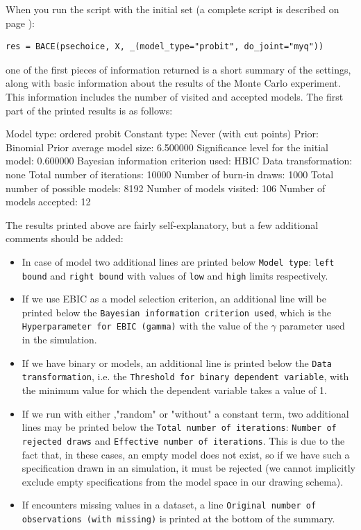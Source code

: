 When you run the script with the initial set (a complete script
is described on page \pageref{sc:initial_script_example}):
\begin{lstlisting}
res = BACE(psechoice, X, _(model_type="probit", do_joint="myq"))
\end{lstlisting}
one of the first pieces of information returned is a short
summary of the  settings, along with basic
information about the results of the Monte Carlo experiment.
This information includes the number of visited and accepted
models. The first part of the printed results is as follows:
\begin{CodeChunk}\begin{CodeOutput}
Model type: ordered probit
Constant type: Never (with cut points)
Prior: Binomial
Prior average model size: 6.500000
Significance level for the initial model: 0.600000
Bayesian information criterion used: HBIC
Data transformation: none
Total number of iterations: 10000
Number of burn-in draws: 1000
Total number of possible models: 8192
Number of models visited: 106
Number of models accepted: 12
\end{CodeOutput}
\end{CodeChunk}
The results printed above are fairly self-explanatory,
but a few additional comments should be added:
\begin{itemize}
	\item In case of  model two
		additional lines are printed below \texttt{Model type}:
		\texttt{left bound} and \texttt{right bound}
		with values of \texttt{low} and \texttt{high}
		limits respectively.		
	\item If we use EBIC as a model selection criterion,
		an additional line will be printed below the
		\texttt{Bayesian information criterion used}, which
		is the \texttt{Hyperparameter for EBIC (gamma)}
		with the value of the $\gamma$ parameter used in the simulation.			
	\item If we have binary  or 
		models, an additional line is printed below the
		\texttt{Data transformation}, i.e. the \texttt{Threshold
		for binary dependent variable}, with the minimum value
		for which the dependent variable takes a value of 1.		
	\item If we run  with either ,"random" or "without"
		a constant term, two additional lines may be printed below
		the \texttt{Total number of iterations}: \texttt{Number of
		rejected draws} and \texttt{Effective number of iterations}.
		This is due to the fact that, in these cases, an empty model
		does not exist, so if we have such a specification drawn in
		an \MCcube simulation, it must be rejected (we cannot implicitly
		exclude empty specifications from the model space in our drawing schema).
	\item If   encounters missing values in a dataset,
		a line \texttt{Original number of observations (with missing)}
		is printed at the bottom of the summary.
\end{itemize}
